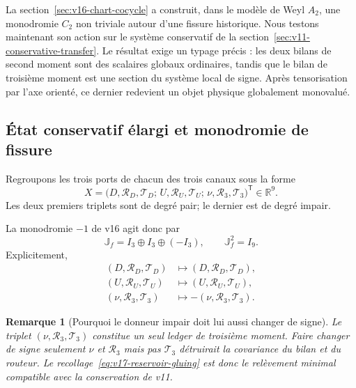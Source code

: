 \documentclass[11pt,a4paper]{article}
\newtheorem{remark}[theorem]{Remarque}
\newcommand{\R}{\mathbb R}
\begin{document}
La section~\ref{sec:v16-chart-cocycle} a construit, dans le modèle de Weyl $A_2$, une monodromie $C_2$ non triviale autour d'une fissure historique. Nous testons maintenant son action sur le système conservatif de la section~\ref{sec:v11-conservative-transfer}. Le résultat exige un typage précis : les deux bilans de second moment sont des scalaires globaux ordinaires, tandis que le bilan de troisième moment est une section du système local de signe. Après tensorisation par l'axe orienté, ce dernier redevient un objet physique globalement monovalué.

\subsection{État conservatif élargi et monodromie de fissure}

Regroupons les trois ports de chacun des trois canaux sous la forme
\begin{equation}\label{eq:v17-Xcons}
 \boxed{
 X=
 \bigl(
 D,\mathscr R_D,\mathscr T_D;\,
 U,\mathscr R_U,\mathscr T_U;\,
 \nu,\mathscr R_3,\mathscr T_3
 \bigr)^{\mathsf T}\in\R^9.}
\end{equation}
Les deux premiers triplets sont de degré pair; le dernier est de degré impair.

La monodromie $-1$ de v16 agit donc par
\begin{equation}\label{eq:v17-Jf}
 \boxed{
 \mathbb J_f
 =I_3\oplus I_3\oplus(-I_3),
 \qquad
 \mathbb J_f^2=I_9.}
\end{equation}
Explicitement,
\begin{equation}\label{eq:v17-reservoir-gluing}
 \boxed{
 \begin{aligned}
 (D,\mathscr R_D,\mathscr T_D)&\longmapsto
 (D,\mathscr R_D,\mathscr T_D),\\
 (U,\mathscr R_U,\mathscr T_U)&\longmapsto
 (U,\mathscr R_U,\mathscr T_U),\\
 (\nu,\mathscr R_3,\mathscr T_3)&\longmapsto
 -(\nu,\mathscr R_3,\mathscr T_3).
 \end{aligned}}
\end{equation}

\begin{remark}[Pourquoi le donneur impair doit lui aussi changer de signe]
Le triplet $(\nu,\mathscr R_3,\mathscr T_3)$ constitue un seul ledger de troisième moment. Faire changer de signe seulement $\nu$ et $\mathscr R_3$ mais pas $\mathscr T_3$ détruirait la covariance du bilan et du routeur. Le recollage~\eqref{eq:v17-reservoir-gluing} est donc le relèvement minimal compatible avec la conservation de v11.
\end{remark}
\end{document}

